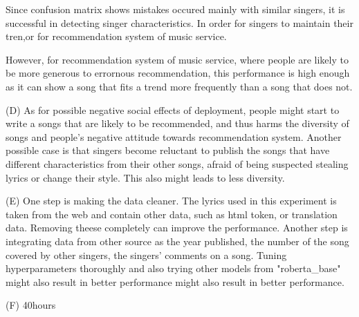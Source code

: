 \documentclass[a4paper,11pt]{article}
\begin{document}
Since confusion matrix shows mistakes occured mainly with similar singers, it is successful in 
detecting singer characteristics. 
In order for singers to maintain their tren,or for recommendation system of music service.

However, for recommendation system of music service, where people are likely to be more generous to errornous recommendation,
this performance is high enough as it can show a song that fits a trend more frequently than a song that does not.

(D)
As for possible negative social effects of deployment, people might start to write a songs that 
are likely to be recommended, and thus harms the diversity of songs and people's negative attitude towards recommendation system.
Another possible case is that singers become reluctant to publish the songs that have different characteristics from their other songs,
afraid of being suspected stealing lyrics or change their style.
This also might leads to less diversity.

(E)
One step is making the data cleaner.
The lyrics used in this experiment is taken from the web and contain other data, such as 
html token, or translation data. Removing theese completely can improve the performance.
Another step is integrating data from other source as the year published, the number of the song covered by other singers, 
the singers' comments on a song.
Tuning hyperparameters thoroughly and also trying other models from "roberta\_base" might also result in better performance might also result in better performance.


(F)
40hours
\end{document}
